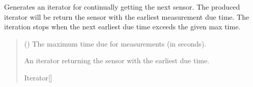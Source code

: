 \documentclass[letterpaper,10pt,english]{sphinxmanual}
\begin{document}
\begin{fulllineitems}
\begin{fulllineitems}
\begin{quote}
\begin{description}
\sphinxAtStartPar
{\hyperref[\detokenize{modules/measurement/sensor:qnav.measurement.sensor.Sensor}]{}}

\end{description}\end{quote}

\end{fulllineitems}


\begin{fulllineitems}
\label{\detokenize{modules/simulation/scheduling:qnav.simulation.scheduling.TimingHandler.sensor_iterator}}
\pysigstartsignatures
{}
\pysigstopsignatures
\sphinxAtStartPar
Generates an iterator for continually getting the next sensor.
The produced iterator will be return the sensor with the earliest
measurement due time. The iteration stops when the next earliest
due time exceeds the given max time.
\begin{quote}\begin{description}
\sphinxAtStartPar
{} () \textendash{} The maximum time due for measurements (in seconds).

\sphinxAtStartPar
An iterator returning the sensor with the earliest due time.

\sphinxAtStartPar
Iterator{[}{\hyperref[\detokenize{modules/measurement/sensor:qnav.measurement.sensor.Sensor}]{}}{]}

\end{description}\end{quote}

\end{fulllineitems}



\end{fulllineitems}
\end{document}
